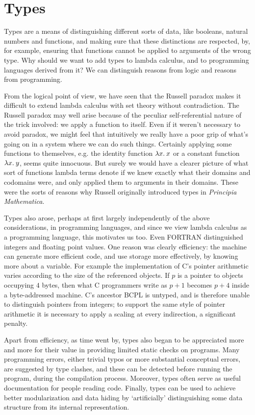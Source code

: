 \chapter{Types}

Types are a means of distinguishing different sorts of data, like booleans,
natural numbers and functions, and making sure that these distinctions are
respected, by, for example, ensuring that functions cannot be applied to
arguments of the wrong type. Why should we want to add types to lambda
calculus, and to programming languages derived from it? We can distinguish
reasons from logic and reasons from programming.

From the logical point of view, we have seen that the Russell paradox makes it
difficult to extend lambda calculus with set theory without contradiction. The
Russell paradox may well arise because of the peculiar self-referential nature
of the trick involved: we apply a function to itself. Even if it weren't
necessary to avoid paradox, we might feel that intuitively we really have a
poor grip of what's going on in a system where we can do such things. Certainly
applying some functions to themselves, e.g. the identity function $\lambda x.\: x$
or a constant function $\lambda x.\: y$, seems quite innocuous. But surely we would
have a clearer picture of what sort of functions lambda terms denote if we knew
exactly what their domains and codomains were, and only applied them to
arguments in their domains. These were the sorts of reasons why Russell
originally introduced types in {\em Principia Mathematica}.

Types also arose, perhaps at first largely independently of the above
considerations, in programming languages, and since we view lambda calculus as
a programming language, this motivates us too. Even FORTRAN distinguished
integers and floating point values. One reason was clearly efficiency: the
machine can generate more efficient code, and use storage more effectively, by
knowing more about a variable. For example the implementation of C's pointer
arithmetic varies according to the size of the referenced objects. If $p$ is a
pointer to objects occupying $4$ bytes, then what C programmers write as $p +
1$ becomes $p + 4$ inside a byte-addressed machine. C's ancestor BCPL is
untyped, and is therefore unable to distinguish pointers from integers; to
support the same style of pointer arithmetic it is necessary to apply a scaling
at every indirection, a significant penalty.

Apart from efficiency, as time went by, types also began to be appreciated more
and more for their value in providing limited static checks on programs. Many
programming errors, either trivial typos or more substantial conceptual errors,
are suggested by type clashes, and these can be detected before running the
program, during the compilation process. Moreover, types often serve as useful
documentation for people reading code. Finally, types can be used to achieve
better modularization and data hiding by `artificially' distinguishing some
data structure from its internal representation.

